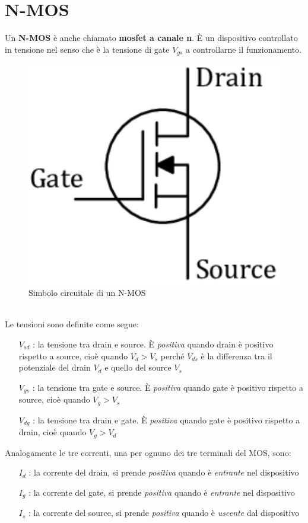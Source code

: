 \documentclass[12pt, a4paper]{report}
\begin{document}
\section{N-MOS}
Un \textbf{N-MOS} è anche chiamato \textbf{mosfet a canale n}. È un dispositivo controllato in tensione nel senso che è la tensione di gate $V_{gs}$ a controllarne il funzionamento.
\begin{figure}[h]
    \centering
    \includegraphics[scale=0.5,angle=0]{n_mos_simbolo.png}
    \caption{Simbolo circuitale di un N-MOS}
\end{figure}
\\Le tensioni sono definite come segue:
\begin{itemize}
    \item[$V_{sd}$]: la tensione tra drain e source. È \textit{positiva} quando drain è positivo rispetto a source, cioè quando $V_{d} > V_{s}$ perché $V_{ds}$ è la differenza tra il potenziale del drain $V_d$ e quello del source $V_s$
    \item[$V_{gs}$]: la tensione tra gate e source. È \textit{positiva} quando gate è positivo rispetto a source, cioè quando $V_{g} > V_{s}$
    \item[$V_{dg}$]: la tensione tra drain e gate. È \textit{positiva} quando gate è positivo rispetto a drain, cioè quando $V_{g} > V_{d}$
\end{itemize}
Analogamente le tre correnti, una per ognuno dei tre terminali del MOS, sono:
\begin{itemize}
    \item[$I_{d}$]: la corrente del drain, si prende \textit{positiva} quando è \textit{entrante} nel dispositivo
    \item[$I_{g}$]: la corrente del gate, si prende \textit{positiva} quando è \textit{entrante} nel dispositivo
    \item[$I_{s}$]: la corrente del source, si prende \textit{positiva} quando è \textit{uscente} dal dispositivo
\end{itemize}
\end{document}
